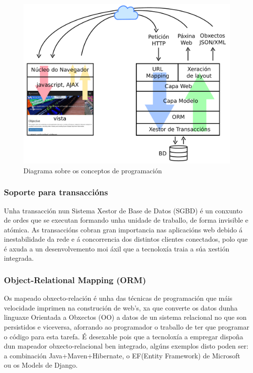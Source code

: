	    \begin{figure}[htp]
        \begin{center}
            \includegraphics[scale=0.4]{figures/fundamentos.pdf}
            \caption{Diagrama sobre os conceptos de programación}
        \label{fig:fundamentos}
        \end{center}
        \end{figure}
        
        \subsubsection{Soporte para transaccións}
            Unha transacción nun Sistema Xestor de Base de Datos (SGBD) é un conxunto de ordes que
            se executan formando unha unidade de traballo, de forma invisible e atómica. 
            As transaccións cobran gran importancia nas aplicacións web debido á inestabilidade 
            da rede e á concorrencia dos distintos clientes conectados, polo que é axuda a un 
            desenvolvemento moi áxil que a tecnoloxía traia a súa xestión integrada.
        
        \subsubsection{Object-Relational Mapping (ORM)}
            Os mapeado obxecto-relación é unha das técnicas de programación que máis velocidade imprimen
            na construción de web's, xa que converte os datos dunha linguaxe Orientada a Obxectos (OO) a 
            datos de un sistema relacional no que son persistidos e viceversa, aforrando ao programador
            o traballo de ter que programar o código para esta tarefa. É desexable pois que a tecnoloxía
            a empregar dispoña dun mapeador obxecto-relacional ben integrado, algúns exemplos disto poden
            ser: a combinación Java+Maven+Hibernate, o EF(Entity Framework) de Microsoft ou os 
            Models de Django.
        
